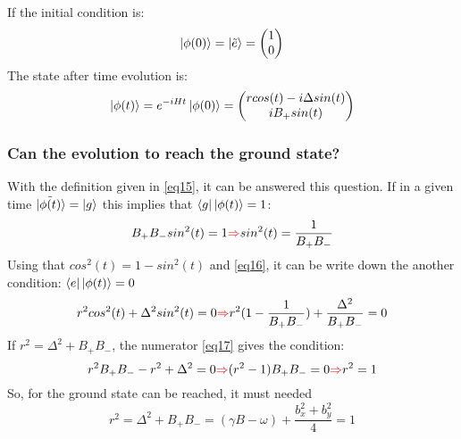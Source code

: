 \documentclass{article}
\begin{document}
If the initial condition is:
\begin{equation}\label{eq14}\ket{\phi(0)}= \ket{\tilde{e}}=\begin{pmatrix}1\\0\end{pmatrix}\end{equation}
The state after time evolution is:
\begin{equation}\label{eq15}\ket{\phi(t)}=e^{-iHt}\ket{\phi(0)}=\begin{pmatrix} rcos(t)-i\Delta sin(t) \\ iB_+ sin(t)\end{pmatrix}\end{equation}
\subsubsection{Can the evolution to reach the ground state?}
With the definition given in \ref{eq15}, it can be answered this question. If in a given time $\ket{\tilde{\phi(t)}}=\ket{g}$ this implies that $\bra{g}\ket{\phi(t)}=1$:
\begin{equation}\label{eq16}B_+B_- sin^2(t)=1 \textcolor{red}{\Rightarrow} sin^2(t)=\frac{1}{B_+B_-} \end{equation}
Using that $cos^2(t)=1-sin^2(t)$ and \ref{eq16}, it can be write down the another condition: $\bra{e}\ket{\phi(t)}=0$
\begin{equation}\label{eq17} r^2 cos^2(t)+\Delta^2 sin^2(t)=0 \textcolor{red}{\Rightarrow}r^2(1-\frac{1}{B_+B_-})+\frac{\Delta^2}{B_+B_-}=0\end{equation}
If $r^2=\Delta^2+B_+B_-$, the numerator \ref{eq17} gives the condition:
\begin{equation}\label{eq18}r^2 B_+B_--r^2+\Delta^2=0 \textcolor{red}{\Rightarrow} (r^2-1)B_+B_-=0 \textcolor{red}{\Rightarrow} r^2= 1\end{equation}
So, for the ground state can be reached, it must needed \begin{equation}\label{eq19}r^2=\Delta^2+B_+B_-=(\gamma B-\omega)+\frac{b_x^2+b_y^2}{4}=1\end{equation}
\end{document}
